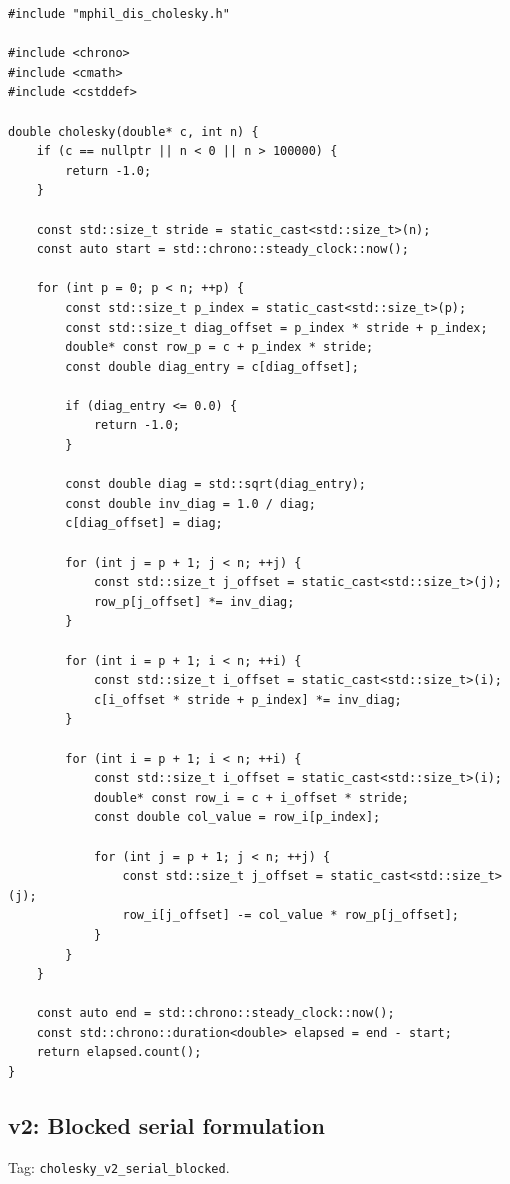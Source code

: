 \begin{lstlisting}[style=appendixcode]
#include "mphil_dis_cholesky.h"

#include <chrono>
#include <cmath>
#include <cstddef>

double cholesky(double* c, int n) {
    if (c == nullptr || n < 0 || n > 100000) {
        return -1.0;
    }

    const std::size_t stride = static_cast<std::size_t>(n);
    const auto start = std::chrono::steady_clock::now();

    for (int p = 0; p < n; ++p) {
        const std::size_t p_index = static_cast<std::size_t>(p);
        const std::size_t diag_offset = p_index * stride + p_index;
        double* const row_p = c + p_index * stride;
        const double diag_entry = c[diag_offset];

        if (diag_entry <= 0.0) {
            return -1.0;
        }

        const double diag = std::sqrt(diag_entry);
        const double inv_diag = 1.0 / diag;
        c[diag_offset] = diag;

        for (int j = p + 1; j < n; ++j) {
            const std::size_t j_offset = static_cast<std::size_t>(j);
            row_p[j_offset] *= inv_diag;
        }

        for (int i = p + 1; i < n; ++i) {
            const std::size_t i_offset = static_cast<std::size_t>(i);
            c[i_offset * stride + p_index] *= inv_diag;
        }

        for (int i = p + 1; i < n; ++i) {
            const std::size_t i_offset = static_cast<std::size_t>(i);
            double* const row_i = c + i_offset * stride;
            const double col_value = row_i[p_index];

            for (int j = p + 1; j < n; ++j) {
                const std::size_t j_offset = static_cast<std::size_t>(j);
                row_i[j_offset] -= col_value * row_p[j_offset];
            }
        }
    }

    const auto end = std::chrono::steady_clock::now();
    const std::chrono::duration<double> elapsed = end - start;
    return elapsed.count();
}
\end{lstlisting}

\subsection{v2: Blocked serial formulation}

Tag: \texttt{cholesky\_v2\_serial\_blocked}.

